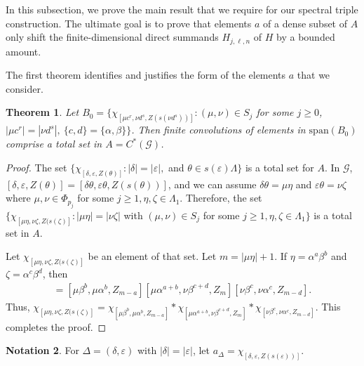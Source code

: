 \documentclass[12pt]{amsart}
\newcommand{\spn}{\text{span}}
\newcommand{\mc}[1]{\mathcal{#1}}
\newcommand{\al}{\alpha}
\newcommand{\be}{\beta}
\newcommand{\de}{\delta}
\newcommand{\De}{\Delta}
\newcommand{\ep}{\varepsilon}
\newcommand{\ze}{\zeta}
\renewcommand{\th}{\theta}
\newcommand{\La}{\Lambda}
\theoremstyle{plain} %
\newtheorem{Theorem}{Theorem}[section]
\theoremstyle{definition} %
\newtheorem{Notation}[Theorem]{Notation}
\begin{document}
In this subsection, we prove the main result that we require for our spectral triple construction. The ultimate goal is to prove that elements $a$ of a dense subset of $A$ only shift the finite-dimensional direct summands $H_{j,\ell,n}$ of $H$ by a bounded amount.

The first theorem identifies and justifies the form of the elements $a$ that we consider.

\begin{Theorem}\label{thm total set for A}
    Let $B_0 = \{\chi_{[\mu c^r, \nu d^s, Z(s(\nu d^s))]} : (\mu, \nu) \in S_j$ for some $j \ge 0$, $|\mu c^r| = |\nu d^s|, \ \{c, d\} = \{\al,\be\} \}$. Then finite convolutions of elements in $\spn (B_0)$ comprise a total set in $A = C^{*}(\mc{G})$.
\end{Theorem}

\begin{proof}
    The set $\{\chi_{[\de, \ep, Z(\th)]} : |\de| = |\ep|,$ and $\th \in s(\ep) \La \}$ is a total set for $A$. In $\mc{G}$, $[\de, \ep, Z(\th)] = [\de\th, \ep\th, Z(s(\th))]$,
    and we can assume $\de \th = \mu \eta$ and $\ep \th = \nu \ze$ where $\mu, \nu \in \Phi_{p_j}$ for some $j \ge 1, \eta, \ze \in \La_1$. Therefore, the set $\{\chi_{[\mu\eta, \nu\ze, Z(s(\ze)]} :  |\mu\eta|= |\nu\ze|$ with $(\mu, \nu) \in S_{j}$ for some $j \ge 1, \eta, \ze \in \La_1\}$ is a total set in $A$.
    
    Let $\chi_{[\mu\eta, \nu\ze, Z(s(\ze)]}$ be an element of that set.
    Let $m = |\mu\eta| + 1.$ If $\eta = \al^a \be^b$ and $\ze = \al^c \be^d$, then
    \begin{align*}
        [\mu \al^a \be^b, \nu\al^c \be^b, Z_m] =  [\mu \be^b, \mu \al^b, Z_{m-a}] [\mu \al^{a+b}, \nu \be^{c+d}, Z_m] [\nu \be^c, \nu\al^c, Z_{m-d}].
    \end{align*}
    Thus, $\chi_{[\mu\eta, \nu\ze, Z(s(\ze)]} = \chi_{[\mu \be^b, \mu \al^b, Z_{m-a}]} * \chi_{[\mu \al^{a+b}, \nu \be^{c+d}, Z_m]} * \chi_{[\nu \be^c, \nu\al^c, Z_{m-d}]}$. This completes the proof.
\end{proof}


\begin{Notation}
    For $\De = (\de, \ep)$ with $|\de| = |\ep|$, let $a_{\De} = \chi_{[\de, \ep, Z(s(\ep))]}$.
\end{Notation}
\end{document}

